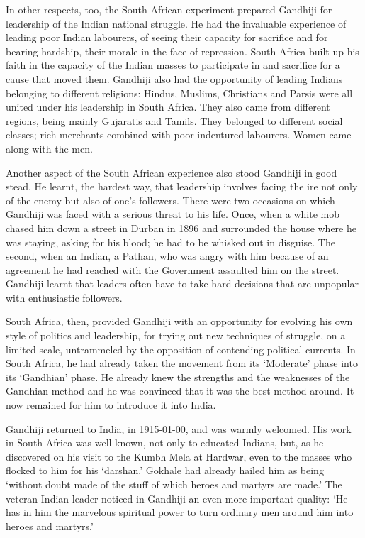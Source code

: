 \begin{multicols}{2}
In other respects, too, the South African experiment prepared Gandhiji for leadership of the Indian national struggle. He had the invaluable experience of leading poor Indian labourers, of seeing their capacity for sacrifice and for bearing hardship, their morale in the face of repression. South Africa built up his faith in the capacity of the Indian masses to participate in and sacrifice for a cause that moved them. Gandhiji also had the opportunity of leading Indians belonging to different religions: Hindus, Muslims, Christians and Parsis were all united under his leadership in South Africa. They also came from different regions, being mainly Gujaratis and Tamils. They belonged to different social classes; rich merchants combined with poor indentured labourers. Women came along with the men.

Another aspect of the South African experience also stood Gandhiji in good stead. He learnt, the hardest way, that leadership involves facing the ire not only of the enemy but also of one's followers. There were two occasions on which Gandhiji was faced with a serious threat to his life. Once, when a white mob chased him down a street in Durban in 1896 and surrounded the house where he was staying, asking for his blood; he had to be whisked out in disguise. The second, when an Indian, a Pathan, who was angry with him because of an agreement he had reached with the Government assaulted him on the street. Gandhiji learnt that leaders often have to take hard decisions that are unpopular with enthusiastic followers.

South Africa, then, provided Gandhiji with an opportunity for evolving his own style of politics and leadership, for trying out new techniques of struggle, on a limited scale, untrammeled by the opposition of contending political currents. In South Africa, he had already taken the movement from its `Moderate' phase into its `Gandhian' phase. He already knew the strengths and the weaknesses of the Gandhian method and he was convinced that it was the best method around. It now remained for him to introduce it into India.

Gandhiji returned to India, in 1915-01-00, and was warmly welcomed. His work in South Africa was well-known, not only to educated Indians, but, as he discovered on his visit to the Kumbh Mela at Hardwar, even to the masses who flocked to him for his `darshan.' Gokhale had already hailed him as being `without doubt made of the stuff of which heroes and martyrs are made.' The veteran Indian leader noticed in Gandhiji an even more important quality: `He has in him the marvelous spiritual power to turn ordinary men around him into heroes and martyrs.'


\end{multicols}
